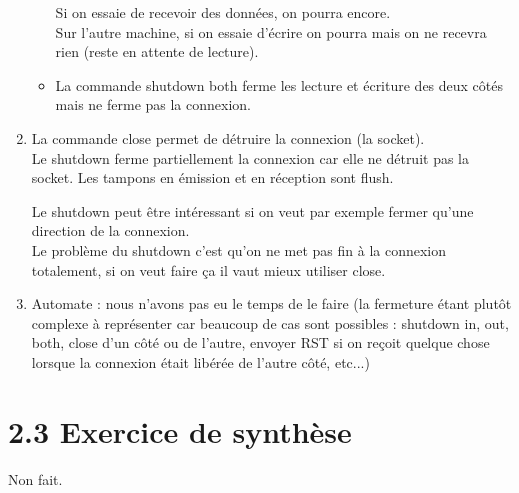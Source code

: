 \documentclass{article}
\begin{document}
\begin{enumerate}[resume]
\begin{itemize}
Si on essaie de recevoir des données, on pourra encore.\\

Sur l'autre machine, si on essaie d'écrire on pourra mais on ne recevra rien (reste en attente de lecture).
	\item La commande shutdown both ferme les lecture et écriture des deux côtés mais ne ferme pas la connexion.
	\end{itemize}
	
	\item La commande close permet de détruire la connexion (la socket).\\
	
Le shutdown ferme partiellement la connexion car elle ne détruit pas la socket. Les tampons en émission et en réception sont flush. 

Le shutdown peut être intéressant si on veut par exemple fermer qu'une direction de la connexion.\\

Le problème du shutdown c'est qu'on ne met pas fin à la connexion totalement, si on veut faire ça il vaut mieux utiliser close.
	
	\item Automate : nous n'avons pas eu le temps de le faire (la fermeture étant plutôt complexe à représenter car beaucoup de cas sont possibles : shutdown in, out, both, close d'un côté ou de l'autre, envoyer RST si on reçoit quelque chose lorsque la connexion était libérée de l'autre côté, etc...)

\end{enumerate}

\section*{2.3 Exercice de synthèse}

Non fait.
\end{document}
